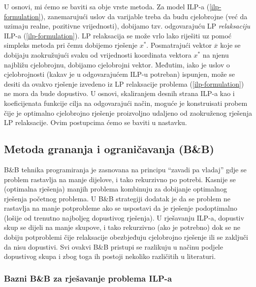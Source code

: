 \documentclass[a4paper, utf8, 11pt, colorlinks]{article}
\begin{document}
U osnovi, mi ćemo se baviti sa obje vrste metoda. Za model ILP-a (\ref{ilp-formulation}), zanemarujući uslov da varijable treba da budu cjelobrojne (već da uzimaju realne, pozitivne vrijednosti), dobijamo tzv. odgovarajuću LP \emph{relaksaciju} ILP-a (\ref{ilp-formulation}). LP relaksacija se može vrlo lako riješiti uz pomoć simpleks metoda pri čemu dobijemo rješenje $x^*$. Posmatrajući vektor $\overline{x}$ koje se dobijaju zaokružujući svaku od vrijednosti koordinata vektora $x^*$ na njenu najbližu cjelobrojnu, dobijamo cjelobrojni vektor. Međutim, iako je uslov o cjelobrojnosti (kakav je u odgovarajućem ILP-u potreban) ispunjen, može se desiti da ovakvo rješenje izvedeno iz LP relaksacije problema (\ref{ilp-formulation}) ne mora da bude dopustivo. U osnovi, skaliranjem desnih strana ILP-a kao i koeficijenata funkcije cilja na odgovarajući način, moguće je konstruisati probem čije je optimalno cjelobrojno rješenje proizvoljno udaljeno od zaokruženog rješenja LP relaksacije. Ovim postupcima ćemo se baviti u nastavku. 

\subsection{Metoda grananja i ograničavanja (B\&B)}
B\&B tehnika programiranja je zasnovana na principu ``zavadi pa vladaj'' gdje se problem rastavlja na manje dijelove, i tako rekurzivno po potrebi. Kasnije se (optimalna rješenja) manjih problema kombinuju za dobijanje optimalnog rješenja početnog problema.  U B\&B strategiji dodatak je da se 
problem ne rastavlja na manje potprobleme ako se uspostavi da je rješenje podoptimalno (lošije od trenutno najboljeg dopustivog rješenja). U rješavanju ILP-a, dopustiv skup se dijeli na manje skupove, i tako rekurzivno (ako je potrebno) dok se ne dobiju potproblemi čije relaksacije obezbjeđuju cjelobrojno rješenje ili se zaključi da nisu dopustivi. Svi ovakvi B\&B pristupi se razlikuju u načinu podjele dopustivog skupa i zbog toga ih postoji nekoliko različitih u literaturi. 

\subsubsection{Bazni B\&B za rješavanje problema ILP-a}
\end{document}
